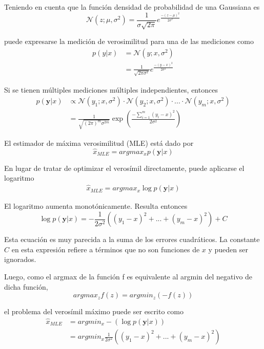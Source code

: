 Teniendo en cuenta que la función densidad de probabilidad de una Gaussiana es
\begin{equation}
    \mathcal{N}(z;\mu,\sigma^2) = \frac{1}{\sigma \sqrt{2\pi}} e^{\frac{-(z-\mu)^2}{2\sigma^2}}
\end{equation}

puede expresarse la medición de verosimilitud para una de las mediciones como
\begin{align}
    p(y|x) &= \mathscr{N}(y;x,\sigma^2) \\
           &= \frac{1}{\sqrt{2\pi\sigma^2}} e^{\frac{-(y-x)^2}{2\sigma^2}}
\end{align}

Si se tienen múltiples mediciones múltiples independientes, entonces
\begin{align}
    p(\textbf{y}|x) &\propto \mathscr{N}(y_1;x,\sigma^2)\cdot\mathscr{N}(y_2;x,\sigma^2)\cdot...\cdot\mathscr{N}(y_m;x,\sigma^2) \\
            &= \frac{1}{\sqrt{(2\pi)^m\sigma^{2m}}} \exp\left({\frac{-\sum_{i=1}^m(y_i-x)^2}{2\sigma^2}}\right)
\end{align}

El estimador de máxima verosimilitud (MLE) está dado por
\begin{equation}
    \hat{x}_{MLE} = argmax_x p(\textbf{y}|x)
\end{equation}

En lugar de tratar de optimizar el verosímil directamente, puede aplicarse el logaritmo
\begin{align}
    \hat{x}_{MLE} = argmax_x \log p(\textbf{y}|x)
\end{align}

El logaritmo aumenta monotónicamente. Resulta entonces
\begin{equation}
    \log p(\textbf{y}|x) = -\frac{1}{2\sigma^2}\left((y_1-x)^2+...+(y_m-x)^2\right)+C
\end{equation}

Esta ecuación es muy parecida a la suma de los errores cuadráticos. La constante $C$ en esta expresión refiere a términos que no son funciones de $x$ y pueden ser ignorados.

Luego, como el argmax de la función f es equivalente al argmin del negativo de dicha función, 
\begin{equation}
    argmax_z f(z) = argmin_z \left(-f(z)\right)
\end{equation}

el problema del verosímil máximo puede ser escrito como
\begin{align}
    \hat{x}_{MLE} &= argmin_x -\left(\log p(\textbf{y}|x)\right) \\
                  &= argmin_x \frac{1}{2\sigma^2}\left((y_1-x)^2+...+(y_m-x)^2\right)
\end{align}


